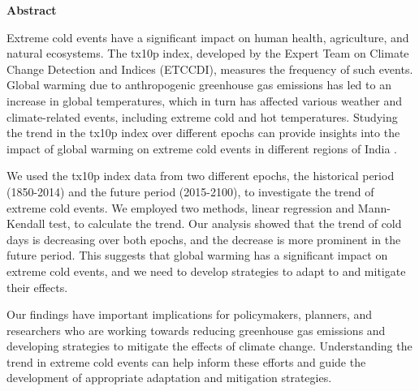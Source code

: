\documentclass[a4paper, 12pt, twoside]{report}
\begin{document}


\newpage
\begin{center}
    \textbf{\Large Abstract}
\end{center}
Extreme cold events have a significant impact on human health, agriculture, and natural ecosystems. The tx10p index, developed by the Expert Team on Climate Change Detection and Indices (ETCCDI), measures the frequency of such events. Global warming due to anthropogenic greenhouse gas emissions has led to an increase in global temperatures, which in turn has affected various weather and climate-related events, including extreme cold and hot temperatures. Studying the trend in the tx10p index over different epochs can provide insights into the impact of global warming on extreme cold events in different regions of India  \cite{https://doi.org/10.1002/2016GL067841} .

We used the tx10p index data from two different epochs, the historical period (1850-2014) and the future period (2015-2100), to investigate the trend of extreme cold events. We employed two methods, linear regression and Mann-Kendall test, to calculate the trend. Our analysis showed that the trend of cold days is decreasing over both epochs, and the decrease is more prominent in the future period. This suggests that global warming has a significant impact on extreme cold events, and we need to develop strategies to adapt to and mitigate their effects.

Our findings have important implications for policymakers, planners, and researchers who are working towards reducing greenhouse gas emissions and developing strategies to mitigate the effects of climate change. Understanding the trend in extreme cold events can help inform these efforts and guide the development of appropriate adaptation and mitigation strategies.

\newpage
\restoregeometry

\listoffigures
\end{document}
